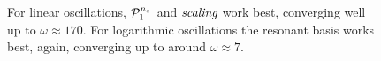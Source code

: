\begin{figure}[!pth]
\centering
{}\\
\\
\caption{
    For linear oscillations,
    $\mathcal{P}^{n_s}_1$ and $\textit{scaling}$ work best, converging well up to $\omega\approx170$.
    For logarithmic oscillations the resonant basis works best,
    again, converging up to around $\omega\approx7$.
    }\label{fig:plot_freq_scan_dbi}
\end{figure}

